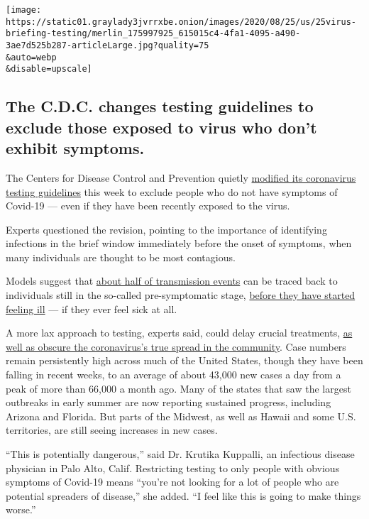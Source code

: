\texttt{[image: https://static01.graylady3jvrrxbe.onion/images/2020/08/25/us/25virus-briefing-testing/merlin\_175997925\_615015c4-4fa1-4095-a490-3ae7d525b287-articleLarge.jpg?quality=75\\\&auto=webp\\\&disable=upscale]}

\hypertarget{the-cdc-changes-testing-guidelines-to-exclude-those-exposed-to-virus-who-dont-exhibit-symptoms}{%
\subsection{The C.D.C. changes testing guidelines to exclude those
exposed to virus who don't exhibit
symptoms.}\label{the-cdc-changes-testing-guidelines-to-exclude-those-exposed-to-virus-who-dont-exhibit-symptoms}}

The Centers for Disease Control and Prevention quietly
\href{https://www.cdc.gov/coronavirus/2019-ncov/hcp/testing-overview.html}{modified
its coronavirus testing guidelines} this week to exclude people who do
not have symptoms of Covid-19 --- even if they have been recently
exposed to the virus.

Experts questioned the revision, pointing to the importance of
identifying infections in the brief window immediately before the onset
of symptoms, when many individuals are thought to be most contagious.

Models suggest that
\href{https://www.nature.com/articles/s41591-020-0869-5}{about half of
transmission events} can be traced back to individuals still in the
so-called pre-symptomatic stage,
\href{https://www.pnas.org/content/117/30/17513}{before they have
started feeling ill} --- if they ever feel sick at all.

A more lax approach to testing, experts said, could delay crucial
treatments,
\href{https://www.nytimes3xbfgragh.onion/2020/07/19/health/coronavirus-testing-viral-spread.html}{as
well as obscure the coronavirus's true spread in the community}. Case
numbers remain persistently high across much of the United States,
though they have been falling in recent weeks, to an average of about
43,000 new cases a day from a peak of more than 66,000 a month ago. Many
of the states that saw the largest outbreaks in early summer are now
reporting sustained progress, including Arizona and Florida. But parts
of the Midwest, as well as Hawaii and some U.S. territories, are still
seeing increases in new cases.

``This is potentially dangerous,'' said Dr. Krutika Kuppalli, an
infectious disease physician in Palo Alto, Calif. Restricting testing to
only people with obvious symptoms of Covid-19 means ``you're not looking
for a lot of people who are potential spreaders of disease,'' she added.
``I feel like this is going to make things worse.''

